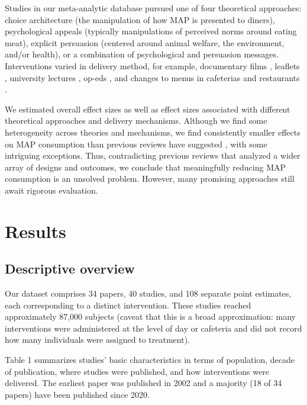 \documentclass[sn-nature,referee,pdflatex]{sn-jnl}
\begin{document}
Studies in our meta-analytic database pursued one of four theoretical
approaches: choice architecture (the manipulation of how MAP is
presented to diners), psychological appeals (typically manipulations of
perceived norms around eating meat), explicit persuasion (centered
around animal welfare, the environment, and/or health), or a combination
of psychological and persuasion messages. Interventions varied in
delivery method, for example, documentary films
\citep{mathur2021effectiveness}, leaflets \citep{peacock2017},
university lectures \citep{jalil2023}, op-eds \citep{haile2021}, and
changes to menus in cafeterias \citep{andersson2021} and restaurants
\citep{coker2022, sparkman2021}.

We estimated overall effect sizes as well as effect sizes associated
with different theoretical approaches and delivery mechanisms. Although
we find some heterogeneity across theories and mechanisms, we find
consistently smaller effects on MAP consumption than previous reviews
have suggested
\citep{bianchi2018restructuring, byerly2018, chang2023, harguess2020, kwasny2022, mathur2021meta, meier2022, pandey2023},
with some intriguing exceptions. Thus, contradicting previous reviews
that analyzed a wider array of designs and outcomes, we conclude that
meaningfully reducing MAP consumption is an unsolved problem. However,
many promising approaches still await rigorous evaluation.

\section{Results}\label{sec2}

\subsection{Descriptive overview}\label{descriptive-overview}

Our dataset comprises 34 papers, 40 studies, and 108 separate point
estimates, each corresponding to a distinct intervention. These studies
reached approximately 87,000 subjects (caveat that this is a broad
approximation: many interventions were administered at the level of day
or cafeteria and did not record how many individuals were assigned to
treatment).

Table 1 summarizes studies' basic characteristics in terms of
population, decade of publication, where studies were published, and how
interventions were delivered. The earliest paper was published in 2002
\citep{allen2002} and a majority (18 of 34 papers) have been published
since 2020.
\end{document}
